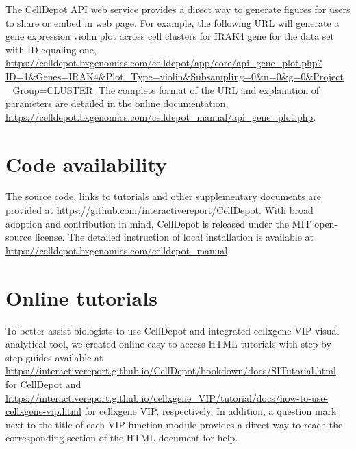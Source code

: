 \documentclass[
  openany]{book}
\begin{document}
The CellDepot API web service provides a direct way to generate figures for users to share or embed in web page. For example, the following URL will generate a gene expression violin plot across cell clusters for IRAK4 gene for the data set with ID equaling one, \url{https://celldepot.bxgenomics.com/celldepot/app/core/api_gene_plot.php?ID=1\&Genes=IRAK4\&Plot_Type=violin\&Subsampling=0\&n=0\&g=0\&Project_Group=CLUSTER}. The complete format of the URL and explanation of parameters are detailed in the online documentation, \url{https://celldepot.bxgenomics.com/celldepot_manual/api_gene_plot.php}.

\hypertarget{code-availability}{%
\section{Code availability}\label{code-availability}}

The source code, links to tutorials and other supplementary documents are provided at \url{https://github.com/interactivereport/CellDepot}. With broad adoption and contribution in mind, CellDepot is released under the MIT open-source license. The detailed instruction of local installation is available at \url{https://celldepot.bxgenomics.com/celldepot_manual}.

\hypertarget{online-tutorials}{%
\section{Online tutorials}\label{online-tutorials}}

To better assist biologists to use CellDepot and integrated cellxgene VIP visual analytical tool, we created online easy-to-access HTML tutorials with step-by-step guides available at \url{https://interactivereport.github.io/CellDepot/bookdown/docs/SITutorial.html} for CellDepot and \url{https://interactivereport.github.io/cellxgene_VIP/tutorial/docs/how-to-use-cellxgene-vip.html} for cellxgene VIP, respectively. In addition, a question mark next to the title of each VIP function module provides a direct way to reach the corresponding section of the HTML document for help.

  
\end{document}

